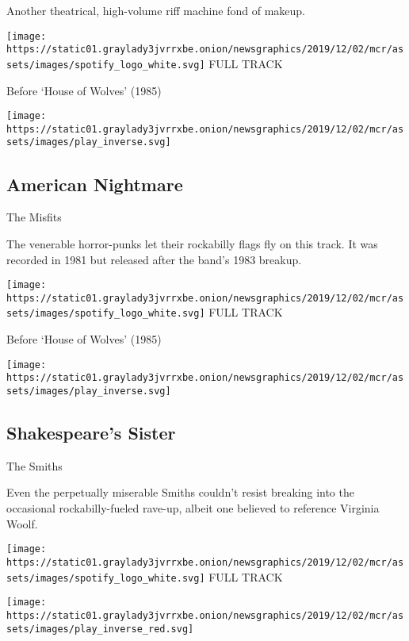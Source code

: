 Another theatrical, high-volume riff machine fond of makeup.

\href{https://open.spotify.com/track/2jz6rWGqVCYsymwxGoaON4?si=QcwVTpvOT-mv2PNe70OW7Q}{}

\texttt{[image: https://static01.graylady3jvrrxbe.onion/newsgraphics/2019/12/02/mcr/assets/images/spotify\_logo\_white.svg]}
FULL TRACK

Before `House of Wolves' (1985)

\texttt{[image: https://static01.graylady3jvrrxbe.onion/newsgraphics/2019/12/02/mcr/assets/images/play\_inverse.svg]}

\hypertarget{american-nightmare}{%
\subsection{American Nightmare}\label{american-nightmare}}

The Misfits

The venerable horror-punks let their rockabilly flags fly on this track.
It was recorded in 1981 but released after the band's 1983 breakup.

\href{https://open.spotify.com/track/5ijiPl0tstOHQl3CZPYq27?si=tFr9G6NES_2cC8SWLZNy5w}{}

\texttt{[image: https://static01.graylady3jvrrxbe.onion/newsgraphics/2019/12/02/mcr/assets/images/spotify\_logo\_white.svg]}
FULL TRACK

Before `House of Wolves' (1985)

\texttt{[image: https://static01.graylady3jvrrxbe.onion/newsgraphics/2019/12/02/mcr/assets/images/play\_inverse.svg]}

\hypertarget{shakespeares-sister}{%
\subsection{Shakespeare's Sister}\label{shakespeares-sister}}

The Smiths

Even the perpetually miserable Smiths couldn't resist breaking into the
occasional rockabilly-fueled rave-up, albeit one believed to reference
Virginia Woolf.

\href{https://open.spotify.com/track/4mYpkmfY0ycWAU3GTKGmRa?si=ViUWR8etSB2N4C2CQpj47g}{}

\texttt{[image: https://static01.graylady3jvrrxbe.onion/newsgraphics/2019/12/02/mcr/assets/images/spotify\_logo\_white.svg]}
FULL TRACK

\texttt{[image: https://static01.graylady3jvrrxbe.onion/newsgraphics/2019/12/02/mcr/assets/images/play\_inverse\_red.svg]}


